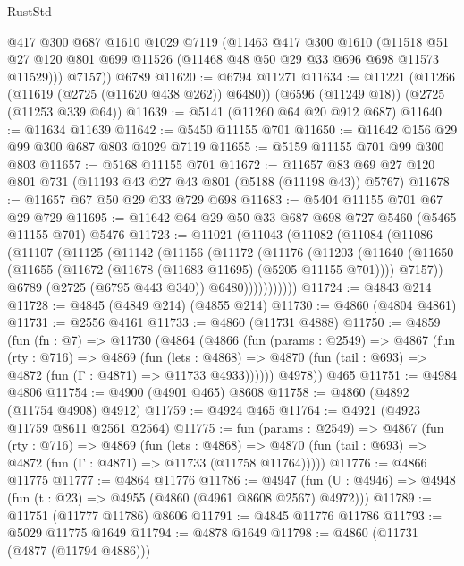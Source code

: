 \begin{lexlean}{RustStd}
\begin{coremodule}
        @417
        @300
        @687
        @1610
        @1029
        @7119
        (@11463
          @417
          @300
          @1610
          (@11518 @51 @27 @120 @801 @699 @11526 (@11468 @48 @50 @29 @33 @696 @698 @11573 @11529)))
        @7157))
    @6789
@11620 := @6794 @11271
@11634 := @11221
    (@11266 (@11619 (@2725 (@11620 @438 @262)) @6480))
    (@6596 (@11249 @18))
    (@2725 (@11253 @339 @64))
@11639 := @5141 (@11260 @64 @20 @912 @687)
@11640 := @11634 @11639
@11642 := @5450 @11155 @701
@11650 := @11642 @156 @29 @99 @300 @687 @803 @1029 @7119
@11655 := @5159 @11155 @701 @99 @300 @803
@11657 := @5168 @11155 @701
@11672 := @11657 @83 @69 @27 @120 @801 @731 (@11193 @43 @27 @43 @801 (@5188 (@11198 @43)) @5767)
@11678 := @11657 @67 @50 @29 @33 @729 @698
@11683 := @5404 @11155 @701 @67 @29 @729
@11695 := @11642 @64 @29 @50 @33 @687 @698 @727 @5460 (@5465 @11155 @701) @5476
@11723 := @11021
    (@11043
      (@11082
        (@11084
          (@11086
            (@11107
              (@11125
                (@11142
                  (@11156
                    (@11172
                      (@11176
                        (@11203
                          (@11640
                            (@11650
                              (@11655 (@11672 (@11678 (@11683 @11695) (@5205 @11155 @701))))
                              @7157))
                          @6789
                          (@2725 (@6795 @443 @340))
                          @6480)))))))))))
@11724 := @4843 @214
@11728 := @4845 (@4849 @214) (@4855 @214)
@11730 := @4860 (@4804 @4861)
@11731 := @2556 @4161
@11733 := @4860 (@11731 @4888)
@11750 := @4859
    (fun (fn : @7) =>
    @11730
      (@4864
        (@4866
          (fun (params : @2549) =>
          @4867
            (fun (rty : @716) =>
            @4869
              (fun (lets : @4868) =>
              @4870 (fun (tail : @693) => @4872 (fun (Γ : @4871) => @11733 @4933))))))
        @4978))
    @465
@11751 := @4984 @4806
@11754 := @4900 (@4901 @465) @8608
@11758 := @4860 (@4892 (@11754 @4908) @4912)
@11759 := @4924 @465
@11764 := @4921 (@4923 @11759 @8611 @2561 @2564)
@11775 := fun (params : @2549) =>
  @4867
    (fun (rty : @716) =>
    @4869
      (fun (lets : @4868) =>
      @4870 (fun (tail : @693) => @4872 (fun (Γ : @4871) => @11733 (@11758 @11764)))))
@11776 := @4866 @11775
@11777 := @4864 @11776
@11786 := @4947
    (fun (U : @4946) => @4948 (fun (t : @23) => @4955 (@4860 (@4961 @8608 @2567) @4972)))
@11789 := @11751 (@11777 @11786) @8606
@11791 := @4845 @11776 @11786
@11793 := @5029 @11775 @1649
@11794 := @4878 @1649
@11798 := @4860 (@11731 (@4877 (@11794 @4886)))

\end{coremodule}
\end{lexlean}
